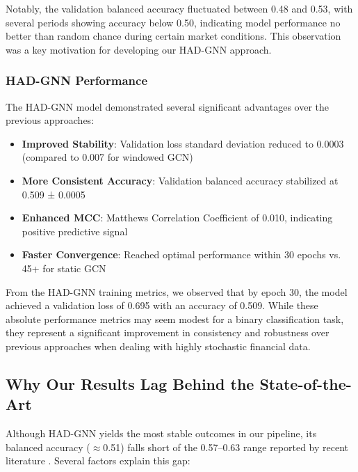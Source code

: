 \documentclass[12pt]{article}
\begin{document}
Notably, the validation balanced accuracy fluctuated between 0.48 and 0.53, with several periods showing accuracy below 0.50, indicating model performance no better than random chance during certain market conditions. This observation was a key motivation for developing our HAD-GNN approach.

\subsubsection{HAD-GNN Performance}

The HAD-GNN model demonstrated several significant advantages over the previous approaches:

\begin{itemize}
    \item \textbf{Improved Stability}: Validation loss standard deviation reduced to 0.0003 (compared to 0.007 for windowed GCN)
    \item \textbf{More Consistent Accuracy}: Validation balanced accuracy stabilized at 0.509 ± 0.0005
    \item \textbf{Enhanced MCC}: Matthews Correlation Coefficient of 0.010, indicating positive predictive signal
    \item \textbf{Faster Convergence}: Reached optimal performance within 30 epochs vs. 45+ for static GCN
\end{itemize}

From the HAD-GNN training metrics, we observed that by epoch 30, the model achieved a validation loss of 0.695 with an accuracy of 0.509. While these absolute performance metrics may seem modest for a binary classification task, they represent a significant improvement in consistency and robustness over previous approaches when dealing with highly stochastic financial data.

\subsection{Why Our Results Lag Behind the State-of-the-Art}

Although HAD-GNN yields the most stable outcomes in our pipeline, its balanced accuracy ($\approx$0.51) falls short of the 0.57–0.63 range reported by recent literature \cite{du2023,zhang2024,liu2025}. Several factors explain this gap:
\end{document}
